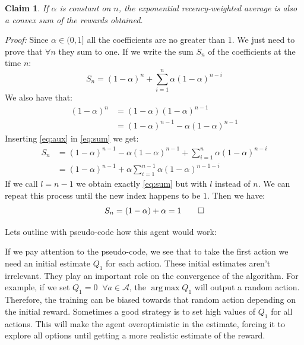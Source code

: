 \documentclass[11pt,a4paper,twoside]{report}
\DeclareMathOperator*{\argmax}{arg\,max}
\newcommand{\+}{\textnormal{+} }
\newtheorem{myclaim}[mythm]{Claim}
\theoremstyle{definition}
\numberwithin{equation}{chapter}
\begin{document}
\begin{myclaim}

  If $\alpha$ is constant on $n$, the exponential recency-weighted average is
  also a convex sum of the rewards obtained.
  \\
\end{myclaim}
  \textit{Proof:} Since $\alpha \in (0,1]$ all the coefficients are no greater
  than 1. We just need to prove that $\forall n$ they sum to one. If we write 
  the sum $S_n$ of the coefficients at the time $n$:
  \begin{equation}
    S_n=(1-\alpha)^{n} + \sum_{i=1}^{n} \alpha(1-\alpha)^{n-i}
    \label{eq:sum}
  \end{equation}
  We also have that: 
  \begin{align}
    (1-\alpha)^n &= (1-\alpha)(1-\alpha)^{n-1} \\
    &=(1-\alpha)^{n-1}-\alpha(1-\alpha)^{n-1}
    \label{eq:aux}
  \end{align}
  Inserting \eqref{eq:aux} in \eqref{eq:sum} we get:
  \begin{align}
    S_n&=(1-\alpha)^{n-1}-\alpha(1-\alpha)^{n-1}+\sum_{i=1}^{n} \alpha(1-\alpha)^{n-i}\\
    &=(1-\alpha)^{n-1} + \alpha \sum_{i=1}^{n-1} \alpha(1-\alpha)^{n-1-i}
  \end{align}
  If we call $l=n-1$ we obtain exactly \eqref{eq:sum} but with $l$ instead of 
  $n$. We can repeat this process until the new index happens to be $1$. Then
  we have:
  \begin{equation}
  S_n = (1-\alpha) + \alpha = 1 \qed 
\end{equation}

Lets outline with pseudo-code how this agent would work:

\makeatletter
\def\BState{\State\hskip-\ALG@thistlm}
\makeatother
\begin{algorithm}
  \caption{}\label{Non-stationary multiarmed-bandit}
  \end{algorithm}

  If we pay attention to the pseudo-code, we see that to take the first action
  we need an initial estimate $Q_1$ for each action. These initial estimates
  aren't irrelevant. They play an important role on the convergence of the
  algorithm. For example, if we set $Q_1=0 \; \; \forall a \in \mathcal{A}$, the
  $\argmax Q_1$ will output a random action. Therefore, the training can be
  biased towards that random action depending on the initial reward. Sometimes a
  good strategy is to set high values of $Q_1$ for all actions. This will make
  the agent overoptimistic in the estimate, forcing it to explore all options
  until getting a more realistic estimate of the reward.
\end{document}
